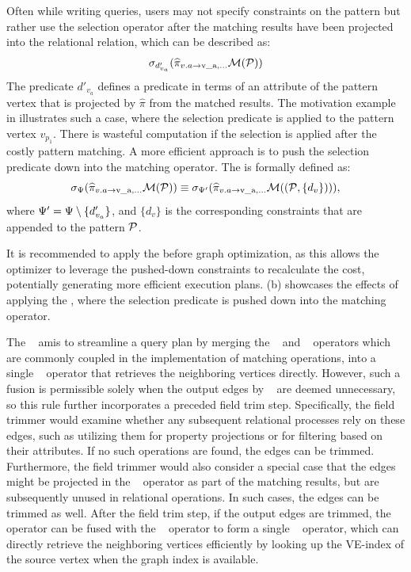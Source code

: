 Often while writing queries, users may not specify constraints on the pattern but rather use the selection operator after the matching results have been projected into the relational relation, which can be described as:
\[
\sigma_{d'_{v_a}} (\widehat{\pi}_{v.a \rightarrow \text{v\_a}, \ldots} \mathcal{M}(\mathcal{P}))
\]
The predicate $d'_{v_a}$ defines a predicate in terms of an attribute of the pattern vertex that is projected by $\widehat{\pi}$ from the matched results. The motivation example in  illustrates such a case, where the selection predicate  is applied to the pattern vertex $v_{p_1}$.
There is wasteful computation if the selection is applied after the costly pattern matching. A more efficient approach is to push the selection predicate down into the matching operator.
The \filterrule is formally defined as:
\begin{equation*}
\sigma_{\Psi} (\widehat{\pi}_{v.a \rightarrow \text{v\_a}, \ldots} \mathcal{M}(\mathcal{P})) \\
\equiv \sigma_{\Psi'} (\widehat{\pi}_{v.a \rightarrow \text{v\_a}, \ldots} \mathcal{M}((\mathcal{P}, \{d_v\}))),
\end{equation*}
where $\Psi' = \Psi \setminus \{d'_{v_a}\}$, and $\{d_v\}$ is the corresponding constraints that are appended to the pattern $\mathcal{P}$.

It is recommended to apply the \filterrule before graph optimization, as this allows the optimizer to leverage the pushed-down constraints to recalculate the cost, potentially generating more efficient execution plans. (b) showcases the effects of applying the \filterrule, where the selection predicate  is pushed down into the matching operator.

The \joinfuserule~ amis to streamline a query plan by merging the \expandedge~ and \getvertex~ operators which are commonly coupled in the implementation of matching operations, into a single \expand~ operator that retrieves the neighboring vertices directly.
However, such a fusion is permissible solely when the output edges by \expandedge~ are deemed unnecessary, so this rule further incorporates a preceded field trim step.
Specifically, the field trimmer would examine whether any subsequent relational processes rely on these edges, such as utilizing them for property projections or for filtering based on their attributes.
If no such operations are found, the edges can be trimmed.
Furthermore, the field trimmer would also consider a special case that the edges might be projected in the \scangraphtable~ operator as part of the matching results, but are subsequently unused in relational operations. In such cases, the edges can be trimmed as well.
After the field trim step, if the output edges are trimmed, the \expandedge~ operator can be fused with the \getvertex~ operator to form a single \expand~ operator, which can directly retrieve the neighboring vertices efficiently by looking up the VE-index of the source vertex when the graph index is available.

